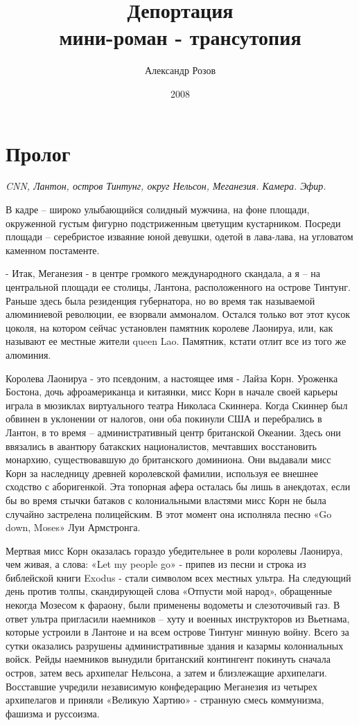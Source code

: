 \documentclass{book}
\title{Депортация\\мини-роман - трансутопия}
\author{Александр Розов}
\date{2008}
\newcommand{\myblock}[1] {
 {
   \begin{flushright}
    \parbox{2in}{{\small \textit{#1}}}
   \end{flushright}
 }
}
\begin{document}
\maketitle

\chapter*{Пролог}
\myblock{CNN, Лантон, остров Тинтунг, округ Нельсон, Меганезия. Камера. Эфир.}

В кадре – широко улыбающийся солидный мужчина, на фоне площади, окруженной густым фигурно подстриженным цветущим кустарником. Посреди площади – серебристое изваяние юной девушки, одетой в лава-лава, на угловатом каменном постаменте.

- Итак, Меганезия - в центре громкого международного скандала, а я – на центральной площади ее столицы, Лантона, расположенного на острове Тинтунг. Раньше здесь была резиденция губернатора, но во время так называемой алюминиевой революции, ее взорвали аммоналом. Остался только вот этот кусок цоколя, на котором сейчас установлен памятник королеве Лаонируа, или, как называют ее местные жители queen Lao. Памятник, кстати отлит все из того же алюминия.

Королева Лаонируа - это псевдоним, а настоящее имя - Лайза Корн. Уроженка Бостона, дочь афроамериканца и китаянки, мисс Корн в начале своей карьеры играла в мюзиклах виртуального театра Николаса Скиннера. Когда Скиннер был обвинен в уклонении от налогов, они оба покинули США и перебрались в Лантон, в то время – административный центр британской Океании. Здесь они ввязались в авантюру батакских националистов, мечтавших восстановить монархию, существовавшую до британского доминиона. Они выдавали мисс Корн за наследницу древней королевской фамилии, используя ее внешнее сходство с аборигенкой. Эта топорная афера осталась бы лишь в анекдотах, если бы во время стычки батаков с колониальными властями мисс Корн не была случайно застрелена полицейским. В этот момент она исполняла песню «Go down, Moses» Луи Армстронга.

Мертвая мисс Корн оказалась гораздо убедительнее в роли королевы Лаонируа, чем живая, а слова: «Let my people go» - припев из песни и строка из библейской книги Exodus - стали символом всех местных ультра. На следующий день против толпы, скандирующей слова «Отпусти мой народ», обращенные некогда Мозесом к фараону, были применены водометы и слезоточивый газ. В ответ ультра пригласили наемников – хуту и военных инструкторов из Вьетнама, которые устроили в Лантоне и на всем острове Тинтунг минную войну. Всего за сутки оказались разрушены административные здания и казармы колониальных войск. Рейды наемников вынудили британский контингент покинуть сначала остров, затем весь архипелаг Нельсона, а затем и близлежащие архипелаги. Восставшие учредили независимую конфедерацию Меганезия из четырех архипелагов и приняли «Великую Хартию» - странную смесь коммунизма, фашизма и руссоизма.
\end{document}
